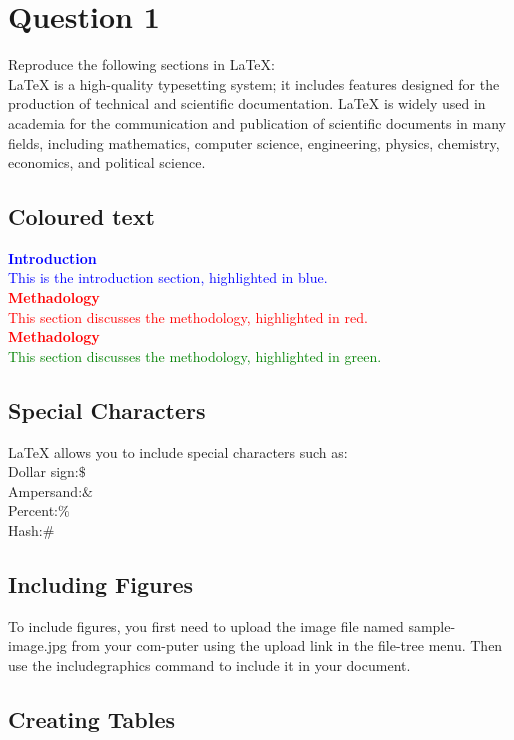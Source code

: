 \documentclass{article}
\begin{document}
	\section{ Question 1}
	Reproduce the following sections in LaTeX:
	\\
	LaTeX is a high-quality typesetting system; it includes features designed for the production of technical
	and scientific documentation. LaTeX is widely used in academia for the communication and publication
	of scientific documents in many fields, including mathematics, computer science, engineering, physics,
	chemistry, economics, and political science.
	\subsection{\textbf{Coloured text}}
	\textbf{\textcolor{blue}{Introduction}}
	\\
	\textcolor{blue}{This is the introduction section, highlighted in blue.}
	\\
		\textbf{\textcolor{red}{Methadology}}
		\\
	\textcolor{red}	{This section discusses the methodology, highlighted in red.}
	\\
		\textbf{\textcolor{red}{Methadology}}
	\\
	\textcolor{green}	{This section discusses the methodology, highlighted in green.}
	
	
	\subsection{Special Characters}
	LaTeX allows you to include special characters such as:
	\\
	Dollar sign:$\$$
	\\
	Ampersand:$\&$
	\\
	Percent:$\%$
	\\
	Hash:$\#$
	\\
	\subsection{Including Figures}
	To include figures, you first need to upload the image file named sample-image.jpg from your com-puter using the upload link in the file-tree menu. Then use the includegraphics command to include	it in your document.
	\subsection{Creating Tables}
	
\end{document}
